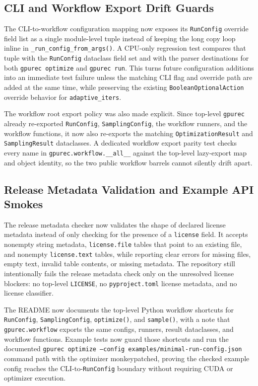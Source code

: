 \documentclass[11pt]{article}
\begin{document}
\subsection{CLI and Workflow Export Drift Guards}

The CLI-to-workflow configuration mapping now exposes its
\texttt{RunConfig} override field list as a single module-level tuple instead
of keeping the long copy loop inline in \texttt{\_run\_config\_from\_args()}.
A CPU-only regression test compares that tuple with the
\texttt{RunConfig} dataclass field set and with the parser destinations for
both \texttt{gpurec optimize} and \texttt{gpurec run}.  This turns future
configuration additions into an immediate test failure unless the matching CLI
flag and override path are added at the same time, while preserving the
existing \texttt{BooleanOptionalAction} override behavior for
\texttt{adaptive\_iters}.

The workflow root export policy was also made explicit.  Since top-level
\texttt{gpurec} already re-exported \texttt{RunConfig},
\texttt{SamplingConfig}, the workflow runners, and the workflow functions, it
now also re-exports the matching \texttt{OptimizationResult} and
\texttt{SamplingResult} dataclasses.  A dedicated workflow export parity test
checks every name in \texttt{gpurec.workflow.\_\_all\_\_} against the
top-level lazy-export map and object identity, so the two public workflow
barrels cannot silently drift apart.

\subsection{Release Metadata Validation and Example API Smokes}

The release metadata checker now validates the shape of declared license
metadata instead of only checking for the presence of a \texttt{license} field.
It accepts nonempty string metadata, \texttt{license.file} tables that point to
an existing file, and nonempty \texttt{license.text} tables, while reporting
clear errors for missing files, empty text, invalid table contents, or missing
metadata.  The repository still intentionally fails the release metadata check
only on the unresolved license blockers: no top-level \texttt{LICENSE}, no
\texttt{pyproject.toml} license metadata, and no license classifier.

The README now documents the top-level Python workflow shortcuts for
\texttt{RunConfig}, \texttt{SamplingConfig}, \texttt{optimize()}, and
\texttt{sample()}, with a note that \texttt{gpurec.workflow} exports the same
configs, runners, result dataclasses, and workflow functions.  Example tests
now guard those shortcuts and run the documented
\texttt{gpurec optimize --config examples/minimal-run-config.json} command path
with the optimizer monkeypatched, proving the checked example config reaches
the CLI-to-\texttt{RunConfig} boundary without requiring CUDA or optimizer
execution.
\end{document}
